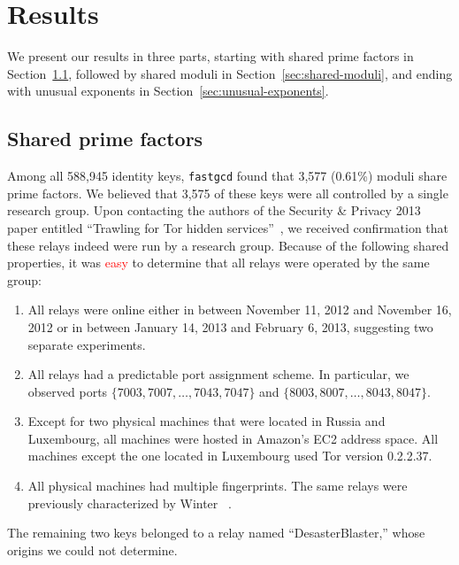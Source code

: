 \section{Results}
\label{sec:results}
We present our results in three parts, starting with shared prime factors in
Section~\ref{sec:shared-primes}, followed by shared moduli in
Section~\ref{sec:shared-moduli}, and ending with unusual exponents 
in Section~\ref{sec:unusual-exponents}.

\subsection{Shared prime factors}
\label{sec:shared-primes}
Among all 588,945 identity keys, \texttt{fastgcd} found that 3,577 (0.61\%) 
moduli share prime factors.  We believed that 3,575 of these keys 
were all controlled by a single research group.  
Upon contacting the authors of the Security \& Privacy
2013 paper entitled ``Trawling for Tor hidden services''~\cite{Biryukov2013a}, 
we received confirmation that these relays indeed were run by a research group.
Because of the following shared properties, it was \textcolor{red}{easy} to determine that all
relays were operated by the same group:

\begin{enumerate}
	\item All relays were online either in between November 11, 2012 and
		November 16, 2012 or in between January 14, 2013 and February 6, 2013,
		suggesting two separate experiments.

	\item All relays had a predictable port assignment scheme.  In particular,
		we observed ports $\{7003, 7007, \dots, 7043, 7047\}$ and $\{8003, 8007,
		\dots, 8043, 8047\}$.

	\item Except for two physical machines that were located in Russia and
		Luxembourg, all machines were hosted in Amazon's EC2 address space.  All
		machines except the one located in Luxembourg used Tor version
		0.2.2.37.

	\item All physical machines had multiple fingerprints.  The same relays were
		previously characterized by Winter \ea~\cite[\S~5.1]{Winter2016a}.
\end{enumerate}

The remaining two keys belonged to a relay named ``DesasterBlaster,'' whose
origins we could not determine.

